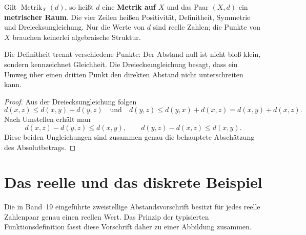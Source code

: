 \documentclass[main.tex]{subfiles}
\begin{document}

Gilt \(\operatorname{Metrik}_{X}(d)\), so heißt \(d\) eine
\textbf{Metrik auf \(X\)} und das Paar \((X,d)\) ein
\textbf{metrischer Raum}. Die vier Zeilen heißen Positivität,
Definitheit, Symmetrie und Dreiecksungleichung. Nur die Werte von \(d\) sind
reelle Zahlen; die Punkte von \(X\) brauchen keinerlei algebraische Struktur.

Die Definitheit trennt verschiedene Punkte: Der Abstand null ist nicht bloß
klein, sondern kennzeichnet Gleichheit. Die Dreiecksungleichung besagt, dass
ein Umweg über einen dritten Punkt den direkten Abstand nicht unterschreiten
kann.

\begin{proof}
Aus der Dreiecksungleichung folgen
\[
 d(x,z)\leq d(x,y)+d(y,z)
 \quad\text{und}\quad
 d(y,z)\leq d(y,x)+d(x,z)=d(x,y)+d(x,z).
\]
Nach Umstellen erhält man
\[
 d(x,z)-d(y,z)\leq d(x,y),
 \qquad
 d(y,z)-d(x,z)\leq d(x,y).
\]
Diese beiden Ungleichungen sind zusammen genau die behauptete
Abschätzung des Absolutbetrags.
\end{proof}

\section{Das reelle und das diskrete Beispiel}

Die in Band~19 eingeführte zweistellige Abstandsvorschrift besitzt für jedes
reelle Zahlenpaar genau einen reellen Wert. Das Prinzip der typisierten
Funktionsdefinition fasst diese Vorschrift daher zu einer Abbildung zusammen.
\end{document}
